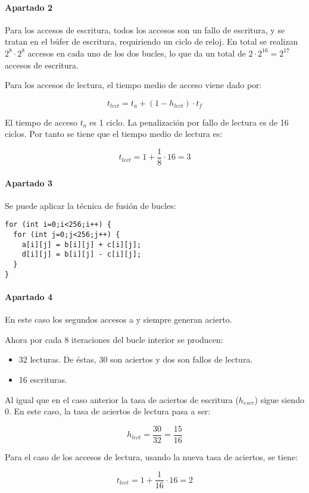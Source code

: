 \paragraph{Apartado 2}

Para los accesos de escritura, todos los accesos son un fallo de escritura, y se tratan en el
búfer de escritura, requiriendo un ciclo de reloj. En total se realizan $2^8 \cdot 2^8$ accesos
en cada uno de los dos bucles, lo que da un total de $2 \cdot 2^{16} = 2^{17}$ accesos de escritura.

Para los accesos de lectura, el tiempo medio de acceso viene dado por:

\[
t_{lect} = t_a + (1 - h_{lect}) \cdot t_f
\]

El tiempo de acceso $t_a$ es 1 ciclo. La penalización por fallo de lectura es de 16 ciclos.
Por tanto se tiene que el tiempo medio de lectura es:

\[
t_{lect} =
1 + \frac{1}{8} \cdot 16 = 
3
\]

\paragraph{Apartado 3}

Se puede aplicar la técnica de fusión de bucles:

\begin{lstlisting}
for (int i=0;i<256;i++) {
  for (int j=0;j<256;j++) {
    a[i][j] = b[i][j] + c[i][j];
    d[i][j] = b[i][j] - c[i][j];
  }
}
\end{lstlisting}

\paragraph{Apartado 4}

En este caso los segundos accesos a  y  siempre generan acierto.

Ahora por cada 8 iteraciones del bucle interior se producen:

\begin{itemize}
  \item 32 lecturas. De éstas, 30 son aciertos y dos son fallos de lectura.
  \item 16 escrituras.
\end{itemize}

Al igual que en el caso anterior la tasa de aciertos de escritura ($h_{escr}$) sigue siendo 0.
En este caso, la tasa de aciertos de lectura pasa a ser:

\[
h_{lect} = \frac{30}{32} = \frac{15}{16}
\]

Para el caso de los accesos de lectura, usando la nueva tasa de aciertos, se tiene:

\[
t_{lect} =
1 + \frac{1}{16} \cdot 16 = 
2
\]

